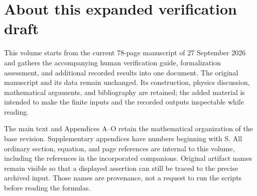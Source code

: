 \clearpage
\section*{About this expanded verification draft}
This volume starts from the current 78-page manuscript of 27 September
2026 and gathers the accompanying human verification guide, formalization
assessment, and additional recorded results into one document. The
original manuscript and its data remain unchanged. Its construction,
physics discussion, mathematical arguments, and bibliography are retained;
the added material is intended to make the finite inputs and the recorded
outputs inspectable while reading.

The main text and Appendices A--O retain the mathematical organization
of the base revision. Supplementary appendices have numbers beginning
with S. All ordinary section, equation, and page references are internal
to this volume, including the references in the incorporated companions.
Original artifact names remain visible so that a displayed assertion can
still be traced to the precise archived input. Those names are provenance,
not a request to run the scripts before reading the formulas.


